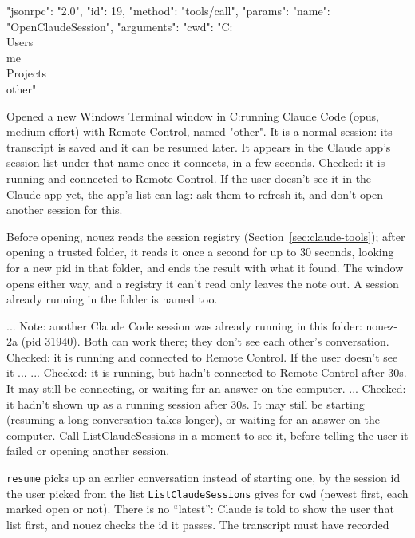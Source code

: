 \documentclass[10pt,a4paper]{article}
\newcommand{\code}[1]{\texttt{#1}}
\begin{document}
\begin{wire}
{"jsonrpc": "2.0", "id": 19, "method": "tools/call", "params": {"name": "OpenClaudeSession", "arguments": {"cwd": "C:\\Users\\me\\Projects\\other"}}}
\end{wire}
\begin{plain}
Opened a new Windows Terminal window in C:\Users\me\Projects\other running Claude Code (opus, medium effort) with Remote Control, named "other". It is a normal session: its transcript is saved and it can be resumed later. It appears in the Claude app's session list under that name once it connects, in a few seconds. Checked: it is running and connected to Remote Control. If the user doesn't see it in the Claude app yet, the app's list can lag: ask them to refresh it, and don't open another session for this.
\end{plain}
Before opening, nouez reads the session registry (Section~\ref{sec:claude-tools}); after
opening a trusted folder, it reads it once a second for up to 30 seconds, looking for a new pid in
that folder, and ends the result with what it found. The window opens either way, and a registry it
can't read only leaves the note out. A session already running in the folder is named too.
\begin{plain}
... Note: another Claude Code session was already running in this folder: nouez-2a (pid 31940). Both can work there; they don't see each other's conversation. Checked: it is running and connected to Remote Control. If the user doesn't see it ...
... Checked: it is running, but hadn't connected to Remote Control after 30s. It may still be connecting, or waiting for an answer on the computer.
... Checked: it hadn't shown up as a running session after 30s. It may still be starting (resuming a long conversation takes longer), or waiting for an answer on the computer. Call ListClaudeSessions in a moment to see it, before telling the user it failed or opening another session.
\end{plain}
\code{resume} picks up an earlier conversation instead of starting one, by the session id the
user picked from the list \code{ListClaudeSessions} gives for \code{cwd} (newest first, each marked open
or not).
There is no ``latest'': Claude is told to show the user that list first, and nouez checks the id it passes. The transcript must have recorded
\end{document}
